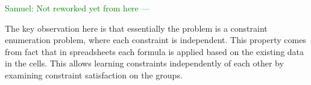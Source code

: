 \documentclass{ecai}
\newcommand{\sergey}[1]{\textcolor{magenta}{{\sc Sergey:} #1}\xspace}
\newcommand{\samuel}[1]{\textcolor{green}{{\sc Samuel:} #1}\xspace}
\newcommand{\constraints}{\ensuremath{\mathcal{T}}\xspace}
\newcommand{\format}[1]{\textit{#1}\xspace}
\newcommand{\template}{\format{constraint template}}
\newcommand{\CSignature}{Signature\xspace}
\newcommand{\CFunction}{Definition\xspace}
\newcommand{\groups}{\ensuremath{\mathcal{G}}\xspace}
\newcommand{\luc}[1]{{\textcolor{red}{#1}}}
\begin{document}






\samuel{Not reworked yet from here ---}

  The key observation here is that essentially the problem is a constraint enumeration problem, where each constraint is independent. This property comes from fact that in spreadsheets each formula is applied based on the existing data in the cells. This allows learning constraints independently of each other by examining constraint satisfaction on the groups.
\end{document}
